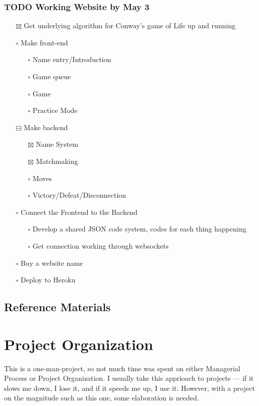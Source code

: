 \documentclass[11pt]{article}
\begin{document}
\subsubsection{{\bfseries\sffamily TODO} Working Website by May 3}
\label{sec:orgf002f4e}
\begin{itemize}
\item[{$\boxtimes$}] Get underlying algorithm for Conway's game of Life up and running
\item[{$\square$}] Make front-end
\begin{itemize}
\item[{$\square$}] Name entry/Introduction
\item[{$\square$}] Game queue
\item[{$\square$}] Game
\item[{$\square$}] Practice Mode
\end{itemize}
\item[{$\boxminus$}] Make backend
\begin{itemize}
\item[{$\boxtimes$}] Name System
\item[{$\boxtimes$}] Matchmaking
\item[{$\square$}] Moves
\item[{$\square$}] Victory/Defeat/Disconnection
\end{itemize}
\item[{$\square$}] Connect the Frontend to the Backend
\begin{itemize}
\item[{$\square$}] Develop a shared JSON code system, codes for each thing happening
\item[{$\square$}] Get connection working through websockets
\end{itemize}
\item[{$\square$}] Buy a website name
\item[{$\square$}] Deploy to Heroku
\end{itemize}
\subsection{Reference Materials}
\label{sec:orgcc7f1ae}
\section{Project Organization}
\label{sec:org807d7d8}
This is a one-man-project, so not much time was spent on either Managerial Process or Project Organization.
I usually take this apprioach to projects --- if it slows me down, I lose it, and if it speeds me up, I use it.
However, with a project on the magnitude such as this one, some elaboration is needed.
\end{document}
